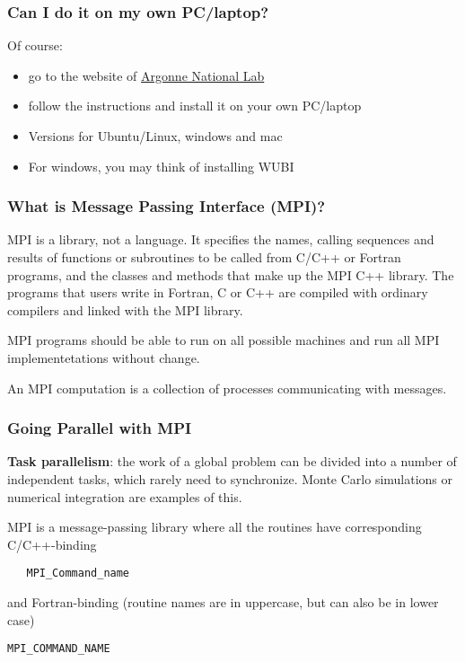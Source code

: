 \documentclass{beamer}
\begin{document}
\begin{frame}
\frametitle{Can I do it on my own PC/laptop?}

\begin{block}{}
Of course:
\begin{itemize}
\item go to the website of \href{{http://www.mcs.anl.gov/research/projects/mpich2/}}{Argonne National Lab}

\item follow the instructions and install it on your own PC/laptop

\item Versions for Ubuntu/Linux, windows and mac

\item For windows, you may think of installing WUBI
\end{itemize}

\noindent
\end{block}
\end{frame}

\begin{frame}
\frametitle{What is Message Passing Interface (MPI)?}

\begin{block}{}

MPI is a library, not a language. It specifies the names, calling sequences and results of functions
or subroutines to be called from C/C++ or Fortran programs, and the classes and methods that make up the MPI C++
library. The programs that users write in Fortran, C or C++ are compiled with ordinary compilers and linked
with the MPI library.

MPI programs should be able to run
on all possible machines and run all MPI implementetations without change.

An MPI computation is a collection of processes communicating with messages.


\end{block}
\end{frame}

\begin{frame}
\frametitle{Going Parallel with MPI}

\begin{block}{}
\textbf{Task parallelism}: the work of a global problem can be divided
into a number of independent tasks, which rarely need to synchronize. 
Monte Carlo simulations or numerical integration are examples of this.


MPI is a message-passing library where all the routines
have corresponding C/C++-binding
\begin{verbatim}
   MPI_Command_name
\end{verbatim}
and Fortran-binding (routine names are in uppercase, but can also be in lower case)
\begin{Verbatim}[numbers=none,fontsize=\fontsize{9pt}{9pt},baselinestretch=0.95]
   MPI_COMMAND_NAME
\end{Verbatim}
\end{block}
\end{frame}
\end{document}
